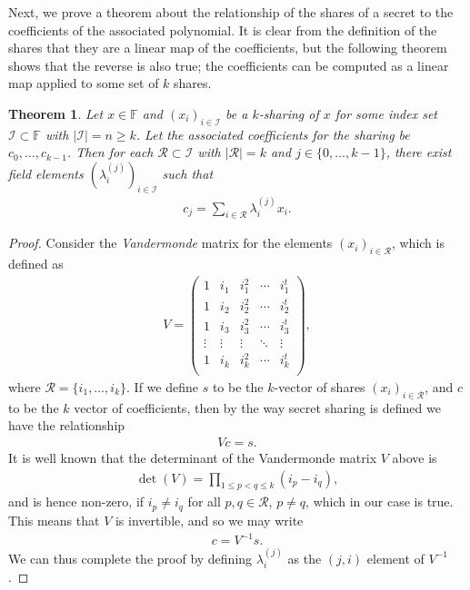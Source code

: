 \documentclass{article}
\newtheorem{theorem}{Theorem}
\theoremstyle{remark}
\newcommand{\F}{\mathbb{F}}
\begin{document}
Next, we prove a theorem about the relationship of the shares of a secret to
the coefficients of the associated polynomial. It is clear from the definition
of the shares that they are a linear map of the coefficients, but the following
theorem shows that the reverse is also true; the coefficients can be computed
as a linear map applied to some set of $k$ shares.

\begin{theorem}\label{thm:shareCoeffLO}
	Let $x \in \F$ and ${(x_i)}_{i \in \mathcal{I}}$ be a $k$-sharing of $x$
	for some index set $\mathcal{I} \subset \F$ with $|\mathcal{I}| = n \ge k$.
	Let the associated coefficients for the sharing be $c_0, \ldots, c_{k-1}$.
	Then for each $\mathcal{R} \subset \mathcal{I}$ with $|\mathcal{R}| = k$
	and $j \in \{0, \ldots, k-1\}$, there exist field elements
	${(\lambda_i^{(j)})}_{i \in \mathcal{I}}$ such that
	\begin{align*}
		c_j = \sum_{i \in \mathcal{R}} \lambda_i^{(j)} x_i.
	\end{align*}
\end{theorem}

\begin{proof}
	Consider the \textit{Vandermonde} matrix for the elements ${(x_i)}_{i \in
	\mathcal{R}}$, which is defined as
	\begin{align*}
		V =
		\begin{pmatrix}
			1 & i_1 & i_1^2 & \cdots & i_1^t\\
			1 & i_2 & i_2^2 & \cdots & i_2^t\\
			1 & i_3 & i_3^2 & \cdots & i_3^t\\
			\vdots & \vdots & \vdots & \ddots & \vdots\\
			1 & i_k & i_k^2 & \cdots & i_k^t\\
		\end{pmatrix},
	\end{align*}
	where $\mathcal{R} = \{i_1, \ldots, i_k\}$. If we define $s$ to be the
	$k$-vector of shares ${(x_i)}_{i \in \mathcal{R}}$, and $c$ to be the $k$
	vector of coefficients, then by the way secret sharing is defined we have
	the relationship
	\begin{align*}
		Vc = s.
	\end{align*}
	It is well known that the determinant of the Vandermonde matrix $V$ above
	is
	\begin{align*}
		\det(V) = \prod_{1 \le p < q \le k} (i_p - i_q),
	\end{align*}
	and is hence non-zero, if $i_p \ne i_q$ for all $p,q \in \mathcal{R}$, $p
	\ne q$, which in our case is true. This means that $V$ is invertible, and
	so we may write
	\begin{align*}
		c = V^{-1}s.
	\end{align*}
	We can thus complete the proof by defining $\lambda_i^{(j)}$ as the $(j,
	i)$ element of $V^{-1}$.
\end{proof}
\end{document}
